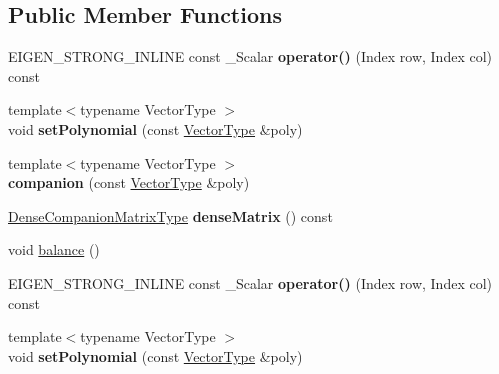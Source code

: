 \subsection*{Public Member Functions}
\begin{DoxyCompactItemize}
\item 
\mbox{\label{class_eigen_1_1internal_1_1companion_a949267ea62d5d18e9b5ef357a72009c3}} 
E\+I\+G\+E\+N\+\_\+\+S\+T\+R\+O\+N\+G\+\_\+\+I\+N\+L\+I\+NE const \+\_\+\+Scalar {\bfseries operator()} (Index row, Index col) const
\item 
\mbox{\label{class_eigen_1_1internal_1_1companion_a9a47d9aae9fa578cb7b0e6531b02dbb0}} 
{\footnotesize template$<$typename Vector\+Type $>$ }\\void {\bfseries set\+Polynomial} (const \hyperlink{struct_vector_type}{Vector\+Type} \&poly)
\item 
\mbox{\label{class_eigen_1_1internal_1_1companion_a83f785c9dd58c7733ed37a962e618b59}} 
{\footnotesize template$<$typename Vector\+Type $>$ }\\{\bfseries companion} (const \hyperlink{struct_vector_type}{Vector\+Type} \&poly)
\item 
\mbox{\label{class_eigen_1_1internal_1_1companion_ad1708946cec9972b8347aa47b72302f2}} 
\hyperlink{group___core___module_class_eigen_1_1_matrix}{Dense\+Companion\+Matrix\+Type} {\bfseries dense\+Matrix} () const
\item 
void \hyperlink{class_eigen_1_1internal_1_1companion_a7362d054f04f6d554fb6c8a279287000}{balance} ()
\item 
\mbox{\label{class_eigen_1_1internal_1_1companion_a949267ea62d5d18e9b5ef357a72009c3}} 
E\+I\+G\+E\+N\+\_\+\+S\+T\+R\+O\+N\+G\+\_\+\+I\+N\+L\+I\+NE const \+\_\+\+Scalar {\bfseries operator()} (Index row, Index col) const
\item 
\mbox{\label{class_eigen_1_1internal_1_1companion_a9a47d9aae9fa578cb7b0e6531b02dbb0}} 
{\footnotesize template$<$typename Vector\+Type $>$ }\\void {\bfseries set\+Polynomial} (const \hyperlink{struct_vector_type}{Vector\+Type} \&poly)

\end{DoxyCompactItemize}
